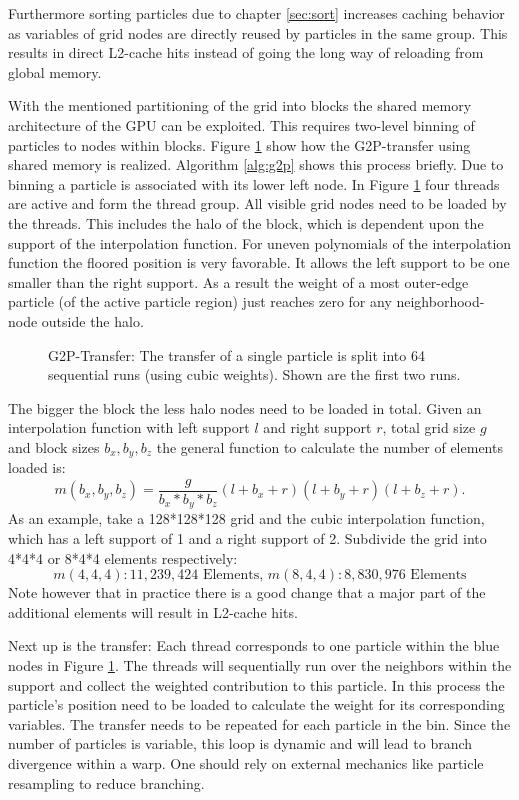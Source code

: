 \documentclass[m,times]{cgMA}
\begin{document}
Furthermore sorting particles due to chapter \ref{sec:sort} increases caching behavior as variables of grid nodes are directly reused by particles in the same group. This results in direct L2-cache hits instead of going the long way of reloading from global memory.

With the mentioned partitioning of the grid into blocks the shared memory architecture of the GPU can be exploited. This requires two-level binning of particles to nodes within blocks. Figure \ref{fig:g2p_transfer} show how the G2P-transfer using shared memory is realized. Algorithm \ref{alg:g2p} shows this process briefly. Due to binning a particle is associated with its lower left node. In Figure \ref{fig:g2p_transfer} four threads are active and form the thread group. All visible grid nodes need to be loaded by the threads. This includes the halo of the block, which is dependent upon the support of the interpolation function. For uneven polynomials of the interpolation function the floored position is very favorable. It allows the left support to be one smaller than the right support. As a result the weight of a most outer-edge particle (of the active particle region) just reaches zero for any neighborhood-node outside the halo.

\begin{figure}[htbp]
    \centering
  
  \caption{G2P-Transfer: The transfer of a single particle is split into 64 sequential runs (using cubic weights). Shown are the first two runs.}
  \label{fig:g2p_transfer}
\end{figure}
The bigger the block the less halo nodes need to be loaded in total. Given an interpolation function with left support $l$ and right support $r$, total grid size $g$ and block sizes $b_x,b_y,b_z$ the general function to calculate the number of elements loaded is:
\begin{equation}
  m(b_x,b_y,b_z) = \frac{g}{b_x*b_y*b_z}(l+b_x+r)(l+b_y+r)(l+b_z+r).
\end{equation}
 As an example, take a 128*128*128 grid and the cubic interpolation function, which has a left support of 1 and a right support of 2. Subdivide the grid into 4*4*4 or 8*4*4 elements respectively:
 $$m(4,4,4): 11,239,424\text{ Elements, }m(8,4,4):  8,830,976\text{ Elements}$$
Note however that in practice there is a good change that a major part of the additional elements will result in L2-cache hits.

Next up is the transfer: Each thread corresponds to one particle within the blue nodes in Figure \ref{fig:g2p_transfer}. The threads will sequentially run over the neighbors within the support and collect the weighted contribution to this particle. In this process the particle's position need to be loaded to calculate the weight for its corresponding variables. The transfer needs to be repeated for each particle in the bin. Since the number of particles is variable, this loop is dynamic and will lead to branch divergence within a warp. One should rely on external mechanics like particle resampling to reduce branching.
\end{document}
